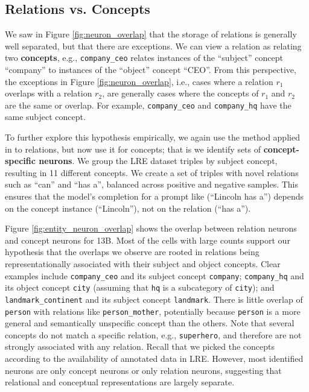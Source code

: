 \subsection{Relations vs. Concepts}
We saw in Figure    \ref{fig:neuron_overlap} that the
storage of relations is generally well separated, but that
there are exceptions. We can view a relation as relating two
\textbf{concepts}, e.g.,     
\texttt{company\_ceo} relates instances of the ``subject'' concept
``company'' to instances of the ``object'' concept ``CEO''. From this
perspective, the exceptions in Figure
\ref{fig:neuron_overlap}, i.e., cases where a relation $r_1$
overlaps with a relation $r_2$, are 
generally cases where the concepts of $r_1$ and $r_2$  are
the same or overlap. For example, \texttt{company\_ceo}
and \texttt{company\_hq} have the same subject concept.


To further explore this hypothesis empirically, 
we again use the method applied in
 to relations, but now use it for
concepts; that is
we identify sets of
\textbf{concept-specific neurons}.
We group the LRE dataset 
triples by 
subject concept,
resulting in 11 different concepts. 
We create a set of triples with novel relations
such as ``can'' and ``has a'', balanced across
positive and negative
samples. This ensures that
the model's completion for a prompt like
(``Lincoln has a'') depends on the concept instance
(``Lincoln''), not on the relation (``has a'').


Figure \ref{fig:entity_neuron_overlap} shows the
overlap between relation neurons and concept neurons for 
13B. Most of the cells with large counts support our
hypothesis that 
the overlaps we observe are rooted in relations being
representationally associated  with their subject and
object concepts.
Clear examples include
\texttt{company\_ceo} and its subject concept
\texttt{company}; 
\texttt{company\_hq} and its object concept 
\texttt{city} (assuming that \texttt{hq} is a subcategory of
\texttt{city});
and \texttt{landmark\_continent} and its subject concept
\texttt{landmark}. There is little overlap of
\texttt{person} with relations like \texttt{person\_mother},
potentially because \texttt{person} is a more general and
semantically unspecific concept than the others. Note that
several concepts do not match a specific relation, e.g.,
\texttt{superhero}, and therefore are not strongly associated
with any relation. Recall that we picked the concepts
according to the availability of annotated data in LRE.
However, most
identified neurons
are only concept neurons or only relation neurons,
suggesting that
relational and conceptual representations are largely separate.


